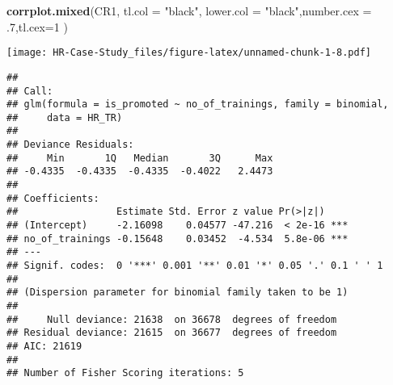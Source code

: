 \documentclass[
]{article}
\newenvironment{Shaded}{\begin{snugshade}}{\end{snugshade}}
\newcommand{\CommentTok}[1]{\textcolor[rgb]{0.56,0.35,0.01}{\textit{#1}}}
\newcommand{\DataTypeTok}[1]{\textcolor[rgb]{0.13,0.29,0.53}{#1}}
\newcommand{\DecValTok}[1]{\textcolor[rgb]{0.00,0.00,0.81}{#1}}
\newcommand{\FloatTok}[1]{\textcolor[rgb]{0.00,0.00,0.81}{#1}}
\newcommand{\KeywordTok}[1]{\textcolor[rgb]{0.13,0.29,0.53}{\textbf{#1}}}
\newcommand{\NormalTok}[1]{#1}
\newcommand{\OperatorTok}[1]{\textcolor[rgb]{0.81,0.36,0.00}{\textbf{#1}}}
\newcommand{\StringTok}[1]{\textcolor[rgb]{0.31,0.60,0.02}{#1}}
\begin{document}
\begin{Shaded}
\begin{Highlighting}[]
\KeywordTok{corrplot.mixed}\NormalTok{(CR1,  }\DataTypeTok{tl.col =} \StringTok{"black"}\NormalTok{, }\DataTypeTok{lower.col =} \StringTok{"black"}\NormalTok{,}\DataTypeTok{number.cex =} \FloatTok{.7}\NormalTok{,}\DataTypeTok{tl.cex=}\DecValTok{1}\NormalTok{ )}
\end{Highlighting}
\end{Shaded}

\texttt{[image: HR-Case-Study\_files/figure-latex/unnamed-chunk-1-8.pdf]}

\begin{Shaded}
\end{Shaded}

\begin{verbatim}
## 
## Call:
## glm(formula = is_promoted ~ no_of_trainings, family = binomial, 
##     data = HR_TR)
## 
## Deviance Residuals: 
##     Min       1Q   Median       3Q      Max  
## -0.4335  -0.4335  -0.4335  -0.4022   2.4473  
## 
## Coefficients:
##                 Estimate Std. Error z value Pr(>|z|)    
## (Intercept)     -2.16098    0.04577 -47.216  < 2e-16 ***
## no_of_trainings -0.15648    0.03452  -4.534  5.8e-06 ***
## ---
## Signif. codes:  0 '***' 0.001 '**' 0.01 '*' 0.05 '.' 0.1 ' ' 1
## 
## (Dispersion parameter for binomial family taken to be 1)
## 
##     Null deviance: 21638  on 36678  degrees of freedom
## Residual deviance: 21615  on 36677  degrees of freedom
## AIC: 21619
## 
## Number of Fisher Scoring iterations: 5
\end{verbatim}
\end{document}
